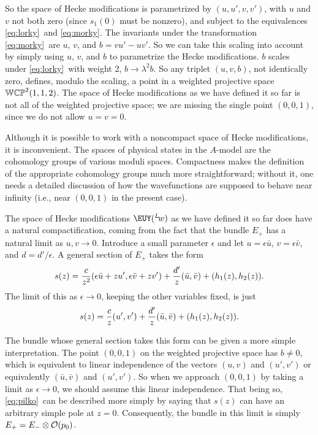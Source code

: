 \def\k{b}
So the space of Hecke modifications is parametrized by
$(u,u',v,v')$, with $u$ and $v$ not both zero (since $s_1(0)$ must
be nonzero), and subject to the equivalences \eqref{eq:lorky}\ and \eqref{eq:morky}.
The invariants under the transformation \eqref{eq:morky}\ are $u$, $v$, and
$\k=vu'-uv'$.  So we can take this scaling into account by simply
using $u$, $v$, and $\k$ to parametrize the Hecke modifications.
$\k$ scales under \eqref{eq:lorky}\ with weight 2, $\k\to \lambda^2\k$. So
any triplet $(u,v,\k)$, not identically zero, defines, modulo the
scaling,  a point in a weighted projective space
$\Bbb{WCP}^2(1,1,2)$.  The space of Hecke modifications as we have
defined it so far is not all of the weighted projective space; we
are missing the single point $(0,0,1)$, since we do not allow
$u=v=0$.

Although it is possible to work with a noncompact space of Hecke
modifications, it is inconvenient.  The spaces of physical states
in the $A$-model are the cohomology groups of various moduli
spaces.  Compactness makes the definition of the appropriate
cohomology groups much more straightforward; without it, one needs
a detailed discussion of how the wavefunctions are supposed to
behave near infinity (i.e., near $(0,0,1)$ in the present case).

The space of Hecke modifications ${{\EUY}}(^L\negthinspace w)$ as
we have defined it so far does have a natural compactification,
coming from the fact that the bundle $E_+$ has a natural limit as
$u,v\to 0$. Introduce a small parameter $\epsilon$ and let
$u=\epsilon \bar u$, $v=\epsilon \bar v$, and $d=d'/\epsilon$. A
general section of $E_+$ takes the form %
\setcounter{equation}{19}
\begin{equation}\label{eq:gilko}
s(z)={c\over
z^2}(\epsilon \bar u+zu',\epsilon \bar v+zv')+{d'\over z} (\bar
u,\bar v)+(h_1(z),h_2(z)).
\end{equation}
 The limit of this as $\epsilon\to 0$,
keeping the other variables fixed, is just %
\setcounter{equation}{20}
\begin{equation}\label{eq:pilko}
s(z)={c\over z}(u',v')+{d'\over z}(\bar u,\bar
v)+(h_1(z),h_2(z)).
\end{equation}

The bundle whose general section takes this form can be given a
more simple interpretation.  The point $(0,0,1)$ on the weighted
projective space has $\k\not=0$, which is equivalent to linear
independence of the vectors $(u,v)$ and $(u',v')$ or equivalently
$(\bar u,\bar v)$ and $(u',v')$. So when we approach $(0,0,1)$ by
taking a limit as $\epsilon\to 0$, we should assume this linear
independence. That being so, \eqref{eq:pilko}\ can be described more simply
by saying that $s(z)$ can have an arbitrary simple pole at $z=0$.
Consequently, the bundle in this limit is simply $E_+=E_-\otimes
{\cal O}(p_0)$.

